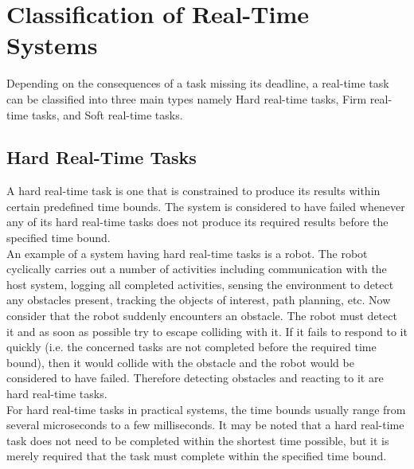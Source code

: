 \documentclass[12pt]{report}
\begin{document}
\section{Classification of Real-Time Systems}
Depending on the consequences of a task missing its deadline, a real-time task can be classified into three main types namely Hard real-time tasks, Firm real-time tasks, and Soft real-time tasks. 

\subsection{Hard Real-Time Tasks}
A hard real-time task is one that is constrained to produce its results within certain predefined time bounds. The system is considered to have failed whenever any of its hard real-time tasks does not produce its required results before the specified time bound. \\

An example of a system having hard real-time tasks is a robot. The robot cyclically carries out a number of activities including communication with the host system, logging all completed activities, sensing the environment to detect any obstacles present, tracking the objects of interest, path planning, etc. Now consider that the robot suddenly encounters an obstacle. The robot must detect it and as soon as possible try to escape colliding with it. If it fails to respond to it quickly (i.e. the concerned tasks are not completed before the required time bound), then it would collide with the obstacle and the robot would be considered to have failed. Therefore detecting obstacles and reacting to it are hard real-time tasks.\\

For hard real-time tasks in practical systems, the time bounds usually range from several microseconds to a few milliseconds. It may be noted that a hard real-time task does not need to be completed within the shortest time possible, but it is merely required that the task must complete within the specified time bound. 
\end{document}
